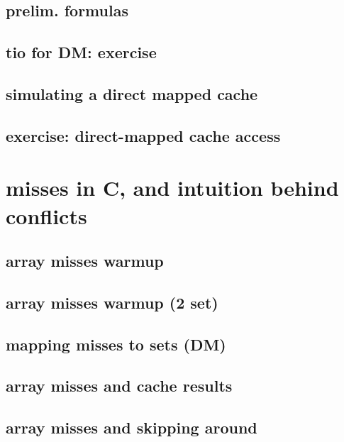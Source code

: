 \subsection{prelim. formulas}


\subsection{tio for DM: exercise}


\subsection{simulating a direct mapped cache}


\subsection{exercise: direct-mapped cache access}


\section{misses in C, and intuition behind conflicts}


\subsection{array misses warmup}


\subsection{array misses warmup (2 set)}


\subsection{mapping misses to sets (DM)}


\subsection{array misses and cache results}


\subsection{array misses and skipping around}


